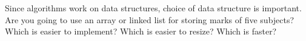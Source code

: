 \documentclass[12pt,a4paper]{article}
\begin{document}
Since algorithms work on data structures, choice of data structure is important. Are you going to use an array or linked list for storing marks of five subjects? Which is easier to implement? Which is easier to resize? Which is faster?
%
%
\end{document}
